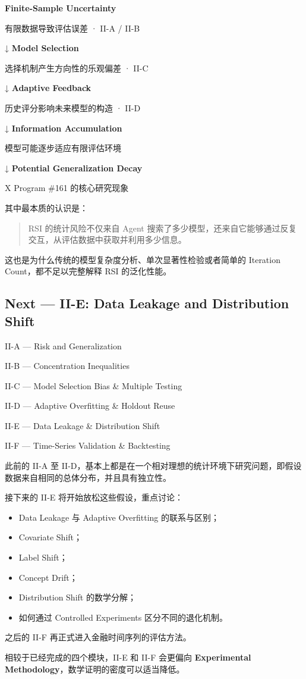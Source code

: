 \textbf{Finite-Sample Uncertainty}

有限数据导致评估误差 · II-A / II-B

↓ \textbf{Model Selection}

选择机制产生方向性的乐观偏差 · II-C

↓ \textbf{Adaptive Feedback}

历史评分影响未来模型的构造 · II-D

↓ \textbf{Information Accumulation}

模型可能逐步适应有限评估环境

↓ \textbf{Potential Generalization Decay}

X Program \#161 的核心研究现象

其中最本质的认识是：

\begin{quote}
RSI 的统计风险不仅来自 Agent 搜索了多少模型，还来自它能够通过反复交互，从评估数据中获取并利用多少信息。
\end{quote}

这也是为什么传统的模型复杂度分析、单次显著性检验或者简单的 Iteration Count，都不足以完整解释 RSI 的泛化性能。

\hypertarget{part-2-20-0001-next-ii-e-data-leakage-and-distribution-shift}{%
\subsection{Next --- II-E: Data Leakage and Distribution Shift}\label{part-2-20-0001-next-ii-e-data-leakage-and-distribution-shift}}

II-A --- Risk and Generalization

II-B --- Concentration Inequalities

II-C --- Model Selection Bias \& Multiple Testing

II-D --- Adaptive Overfitting \& Holdout Reuse

II-E --- Data Leakage \& Distribution Shift

II-F --- Time-Series Validation \& Backtesting

此前的 II-A 至 II-D，基本上都是在一个相对理想的统计环境下研究问题，即假设数据来自相同的总体分布，并且具有独立性。

接下来的 II-E 将开始放松这些假设，重点讨论：

\begin{itemize}
\tightlist
\item
  Data Leakage 与 Adaptive Overfitting 的联系与区别；
\item
  Covariate Shift；
\item
  Label Shift；
\item
  Concept Drift；
\item
  Distribution Shift 的数学分解；
\item
  如何通过 Controlled Experiments 区分不同的退化机制。
\end{itemize}

之后的 II-F 再正式进入金融时间序列的评估方法。

相较于已经完成的四个模块，II-E 和 II-F 会更偏向 \textbf{Experimental Methodology}，数学证明的密度可以适当降低。
